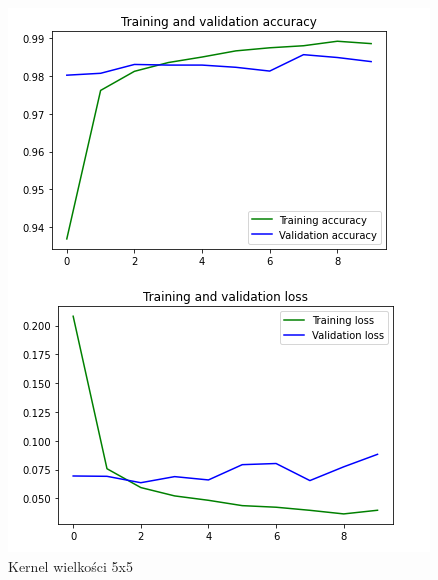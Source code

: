 \documentclass{article}
\begin{document}
\begin{figure}[h]
  \centering
  \includegraphics[width=\linewidth]{kernel_5_5.png}
  \caption{Kernel wielkości 5x5}
\end{figure}
\end{document}
